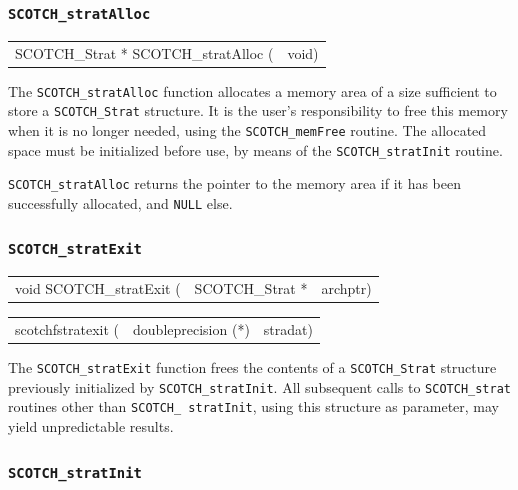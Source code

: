 \subsubsection{{\tt SCOTCH\_stratAlloc}}

\begin{itemize}
\progsyn

{\tt\begin{tabular}{l@{}l}
SCOTCH\_Strat * SCOTCH\_stratAlloc ( & void)
\end{tabular}}

\progdes

The {\tt SCOTCH\_stratAlloc} function allocates a memory area of a
size sufficient to store a {\tt SCOTCH\_\lbt Strat} structure. It is
the user's responsibility to free this memory when it is no longer
needed, using the {\tt SCOTCH\_\lbt mem\lbt Free} routine. The
allocated space must be initialized before use, by means of the
{\tt SCOTCH\_\lbt strat\lbt Init} routine.

\progret

{\tt SCOTCH\_stratAlloc} returns the pointer to the memory area if it
has been successfully allocated, and {\tt NULL} else.
\end{itemize}

\subsubsection{{\tt SCOTCH\_stratExit}}

\begin{itemize}
\progsyn

{\tt\begin{tabular}{l@{}ll}
void SCOTCH\_stratExit ( & SCOTCH\_Strat * & archptr)
\end{tabular}}

{\tt\begin{tabular}{l@{}ll}
scotchfstratexit ( & doubleprecision (*) & stradat)
\end{tabular}}

\progdes

The {\tt SCOTCH\_stratExit} function frees the contents of a
{\tt SCOTCH\_\lbt Strat} structure previously initialized by
{\tt SCOTCH\_\lbt strat\lbt Init}. All subsequent calls to
{\tt SCOTCH\_\lbt strat} routines other than {\tt SCOTCH\_\lbt
strat\lbt Init}, using this structure as parameter, may yield
unpredictable results.
\end{itemize}

\subsubsection{{\tt SCOTCH\_stratInit}}

